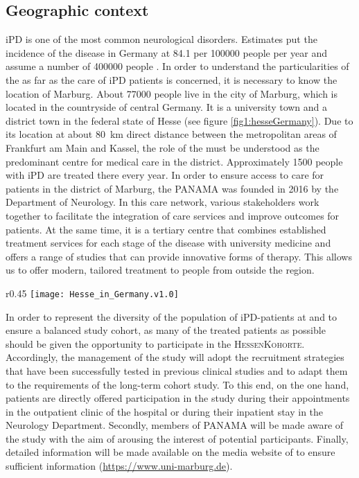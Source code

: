 \subsection{Geographic context}
\ac{iPD} is one of the most common neurological disorders. Estimates put the incidence of the disease in Germany at \SI{84.1}{} per \num[round-precision = 0, round-mode = places]{100000}{} people per year and assume a number of \num[round-precision = 0, round-mode = places]{400000}{} people \citep{nerius2017parkinson}. In order to understand the particularities of the \UKM as far as the care of \ac{iPD} patients is concerned, it is necessary to know the location of Marburg. About \SI[round-precision = 0, round-mode=places]{77000}{} people live in the city of Marburg, which is located in the countryside of central Germany. It is a university town and a district town in the federal state of Hesse (see figure \ref{fig1:hesseGermany}). Due to its location at about \SI{80}{\km} direct distance between the metropolitan areas of Frankfurt am Main and Kassel, the role of the \UKM must be understood as the predominant centre for medical care in the district. Approximately \num[round-precision = 0, round-mode = places]{1500}{} people with \ac{iPD} are treated there every year. In order to ensure access to care for patients in the district of Marburg, the \ac{PANAMA} was founded in 2016 by the Department of Neurology. In this care network, various stakeholders work together to facilitate the integration of care services and improve outcomes for patients. At the same time, it is a tertiary centre that combines established treatment services for each stage of the disease with university medicine and offers a range of studies that can provide innovative forms of therapy. This allows us to offer modern, tailored treatment to people from outside the region.

\begin{wrapfigure}{r}{0.45\textwidth} %
    \label{fig1:hesseGermany}
    \centering
    \texttt{[image: Hesse\_in\_Germany.v1.0]}
    \caption{Location of Hesse in the German Federal Republic}
\end{wrapfigure}

In order to represent the diversity of the population of \ac{iPD}-patients at \UKM and to ensure a balanced study cohort, as many of the treated patients as possible should be given the opportunity to participate in the \textsc{HessenKohorte}. Accordingly, the management of the study will adopt the recruitment strategies that have been successfully tested in previous clinical studies and to adapt them to the requirements of the long-term cohort study. To this end, on the one hand, patients are directly offered participation in the study during their appointments in the outpatient clinic of the hospital or during their inpatient stay in the Neurology Department. Secondly, members of \ac{PANAMA} will be made aware of the study with the aim of arousing the interest of potential participants. Finally, detailed information will be made available on the media website of \UKM to ensure sufficient information (\url{https://www.uni-marburg.de}).
\newpage


